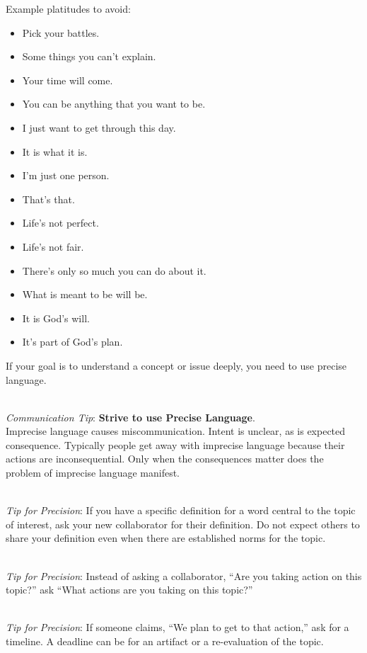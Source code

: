 Example platitudes to avoid:
\begin{itemize}
    \item Pick your battles.
    \item Some things you can't explain.
    \item Your time will come.
    \item You can be anything that you want to be.
    \item I just want to get through this day.
    \item It is what it is.
    \item I'm just one person.
    \item That's that.
    \item Life's not perfect.
    \item Life's not fair.
    \item There's only so much you can do about it.
    \item What is meant to be will be.
    \item It is God's will.
    \item It's part of God's plan.
\end{itemize}

If your goal is to understand a concept or issue deeply, you need to use precise language.

\ \\
\textit{Communication Tip}: \textbf{Strive to use Precise Language}.\\
Imprecise language causes miscommunication. Intent is unclear, as is expected consequence. Typically people get away with imprecise language because their actions are inconsequential. Only when the consequences matter does the problem of imprecise language manifest.

\ \\
\textit{Tip for Precision}: If you have a specific definition for a word central to the topic of interest, ask your new collaborator for their definition. Do not expect others to share your definition even when there are established norms for the topic. 

\ \\
\textit{Tip for Precision}: Instead of asking a collaborator, ``Are you taking action on this topic?'' ask ``What actions are you taking on this topic?''

\ \\
\textit{Tip for Precision}: If someone claims, ``We plan to get to that action,'' ask for a timeline. A deadline can be for an artifact or a re-evaluation of the topic.

